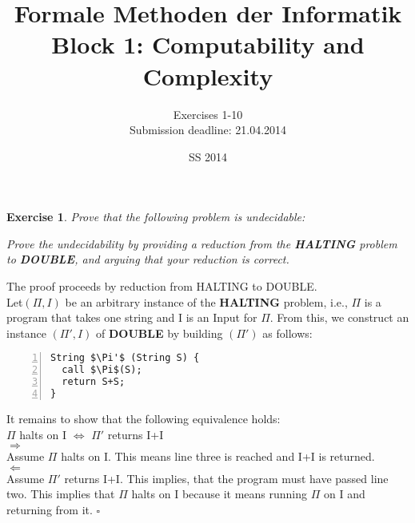 \documentclass [11pt]{article}
\title{Formale Methoden der Informatik \\
Block 1: Computability and Complexity }
\author{Exercises 1-10 \\
Submission deadline: 21.04.2014}
\date{SS 2014}
\newtheorem{exercise}[theorem]{Exercise}
\newcommand{\solution}[1]{\noindent {\bf Solution.}  #1}
\begin{document}
\maketitle


\begin{exercise}
  Prove that the following problem is undecidable:

  \begin{center}
  \end{center}
  Prove the undecidability by providing a reduction from the \textbf{HALTING}
  problem to \textbf{DOUBLE}, and arguing that your reduction is correct.
\end{exercise}


\solution{The proof proceeds by reduction from HALTING to DOUBLE.\\
Let$(\Pi,I)$ be an arbitrary instance of the \textbf{HALTING} problem, i.e., $\Pi$ is a program that takes one string and I is an Input for $\Pi$.
From this, we construct an instance $(\Pi',I)$ of \textbf{DOUBLE} by building $(\Pi')$ as follows:\\}

\begin{lstlisting}[label=haltingtodouble,caption=$\Pi'$,mathescape, numbers=left, numberstyle=\tiny]
String $\Pi'$ (String S) {
  call $\Pi$(S);
  return S+S;
}
\end{lstlisting}
It remains to show that the following equivalence holds:\\
$\Pi$ halts on I $\Leftrightarrow$ $\Pi'$ returns I+I\\
$\Rightarrow$\\
Assume $\Pi$ halts on I. This means line three is reached and I+I is returned.\\
$\Leftarrow$\\
Assume $\Pi'$ returns I+I. This implies, that the program must have passed line two.
This implies that $\Pi$ halts on I because it means running $\Pi$ on I and returning from it.
$\square$
\end{document}
